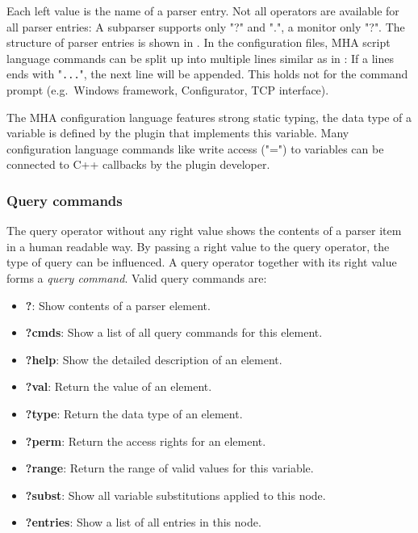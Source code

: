 Each left value is the name of a parser entry. Not all operators are
available for all parser entries: A subparser supports only "?" and
".", a monitor only "?". The structure of parser entries is shown in
. In the configuration files, MHA script
language commands can be split up into multiple lines similar as in
\Matlab{}: If a lines ends with "\verb!...!", the next line will be
appended. This holds not for the command prompt (e.g.\ Windows
framework, Configurator, TCP interface).


The MHA configuration language features strong static typing, the data type
of a variable is defined by the plugin that implements this variable.
Many configuration language commands like write access ("=") to variables can
be connected to C++ callbacks by the plugin developer.

\subsubsection{Query commands}

%
The query operator without any right value shows the contents of a parser item
in a human readable way. By passing a right value to the query operator, the
type of query can be influenced. A query operator together with its right
value forms a {\em query command}. Valid query commands
are:
%
%
%
%
%
%
%
%

\begin{itemize}
\item {\bf ?}: Show contents of a parser element.
\item {\bf ?cmds}: Show a list of all query commands for this element.
\item {\bf ?help}: Show the detailed description of an element.
\item {\bf ?val}: Return the value of an element.
\item {\bf ?type}: Return the data type of an element.
\item {\bf ?perm}: Return the access rights for an element.
\item {\bf ?range}: Return the range of valid values for this variable.
\item {\bf ?subst}: Show all variable substitutions applied to this node.
\item {\bf ?entries}: Show a list of all entries in this node.
\end{itemize}

